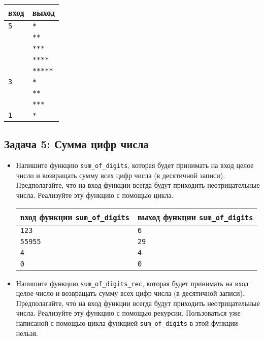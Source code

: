 \documentclass{article}
\begin{document}
\begin{center}
\begin{tabular}{ l | l }
 вход & выход \\ \hline
 \texttt{5} & \texttt{*}  \\  
            & \texttt{**} \\ 
            & \texttt{***} \\ 
            & \texttt{****} \\
            & \texttt{*****} \\ \hline
 \texttt{3} & \texttt{*}  \\  
            & \texttt{**} \\  
            & \texttt{***} \\ \hline
 \texttt{1} & \texttt{*}  \\
\end{tabular}
\end{center}

\subsection*{Задача 5: Сумма цифр числа}
\begin{itemize}
\item Напишите функцию \texttt{sum\_of\_digits}, которая будет принимать на вход целое число и возвращать сумму всех цифр числа (в десятичной записи). Предполагайте, что на вход функции всегда будут приходить неотрицательные числа. Реализуйте эту функцию с помощью цикла.

\begin{center}
\begin{tabular}{ l | l }
 вход функции \texttt{sum\_of\_digits} & выход функции \texttt{sum\_of\_digits} \\ \hline
 \texttt{123} & \texttt{6}  \\
 \texttt{55955} & \texttt{29}  \\  
 \texttt{4} & \texttt{4}  \\
 \texttt{0} & \texttt{0}  \\
\end{tabular}
\end{center}

\item Напишите функцию \texttt{sum\_of\_digits\_rec}, которая будет принимать на вход целое число и возвращать сумму всех цифр числа (в десятичной записи). Предполагайте, что на вход функции всегда будут приходить неотрицательные числа. Реализуйте эту функцию с помощью рекурсии. Пользоваться уже написаной с помощью цикла функцией \texttt{sum\_of\_digits} в этой функции нельзя.
 \end{itemize}
 
\end{document}
